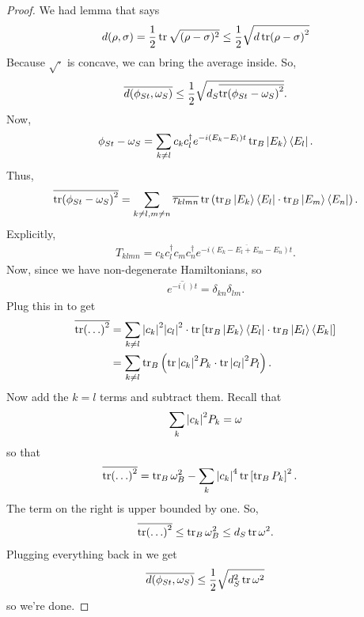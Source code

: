 \documentclass{book}
\theoremstyle{definition}
\newcommand{\nn}{\nonumber}
\newcommand{\f}[2]{\frac{#1}{#2}}
\newcommand{\lp}{\left(}
\newcommand{\rp}{\right)}
\newcommand{\lb}{\left[}
\newcommand{\rb}{\right]}
\begin{document}
\begin{proof}
	We had lemma that says 
	\begin{align}
	d(\rho, \sigma) = \f{1}{2}\tr \sqrt{(\rho - \sigma)^2} \leq \f{1}{2}\sqrt{d\tr (\rho - \sigma)^2}
	\end{align}
	Because $\sqrt{\cdot}$ is concave, we can bring the average inside. So,
	\begin{align}
	\overline{d(\phi_{St}, \omega_S)} \leq \f{1}{2}\sqrt{d_S \overline{\tr(\phi_{St} - \omega_S)^2} }.
	\end{align}
	Now, 
	\begin{align}
	\phi_{St} - \omega_S =  \sum_{k\neq l} c_k c_l^\dagger e^{-i(E_k - E_l)t} \tr_B\ket{E_k}\bra{E_l}.
	\end{align}
	Thus,
	\begin{align}
	\overline{\tr (\phi_{St} - \omega_S)^2} = \sum_{k\neq l, m\neq n}\overline{\tau_{klmn}} \tr \lp \tr_B \ket{E_k}\bra{E_l} \cdot \tr_B \ket{E_m}\bra{E_n}\rp.
	\end{align}
	Explicitly, 
	\begin{align}
	T_{klmn} = c_k c_l^\dagger c_m c_n^\dagger e^{\overline{-i(E_k - E_l + E_m - E_n)t}}. 
	\end{align}
	Now, since we have non-degenerate Hamiltonians, so
	\begin{align}
	\overline{e^{-i()t}} = \delta_{kn}\delta_{lm}.
	\end{align}
	Plug this in to get
	\begin{align}
	\overline{\tr(\dots)^2} &= \sum_{k\neq l} \abs{c_k}^2\abs{c_l}^2 \cdot \tr\lb \tr_B \ket{E_k}\bra{E_l} \cdot \tr_B \ket{E_l} \bra{E_k} \rb \nn\\
	&= \sum_{k\neq l} \tr_B \lp \tr \abs{c_k}^2 P_k  \cdot \tr \abs{c_l}^2 P_l \rp.
	\end{align}
	Now add the $k=l$ terms and subtract them. Recall that
	\begin{align}
	\sum_k \abs{c_k}^2 P_k = \omega
	\end{align}
	so that 
	\begin{align}
	\overline{\tr(\dots)^2} &= \tr_B \omega_B^2 - \sum_k \abs{c_k}^4 \tr \lb \tr_B P_k \rb^2.
	\end{align}
	The term on the right is upper bounded by one. So,
	\begin{align}
	\overline{\tr(\dots)^2} \leq \tr_B \omega_B^2 \leq d_S \tr \omega^2.
	\end{align}
	Plugging everything back in we get
	\begin{align}
	\overline{d(\phi_{St}, \omega_S)} \leq \f{1}{2}\sqrt{d_S^2 \tr \omega^2}
	\end{align}
	so we're done. 
	
\end{proof}
\end{document}
